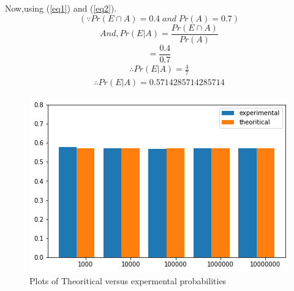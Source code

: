 \documentclass[journal,12pt,twocolumn]{IEEEtran}
\begin{document}
Now,using (\ref{eq1}) and (\ref{eq2}). 
$$(\because Pr(E \cap A)=0.4\; and \; Pr(A)=0.7)$$
$$And, Pr(E|A)=\frac{Pr(E\cap A)}{Pr(A)}$$
$$=\frac{0.4}{0.7}$$
\begin{align}
\therefore Pr(E|A)=\frac{4}{7}    
\end{align}
\begin{align}
\therefore Pr(E|A)=0.5714285714285714    
\end{align}
\begin{figure}
   \caption{Plots of Theoritical versus expermental probabilities}
    \centering
    \includegraphics[width=\columnwidth]
    {Figure.png}
\end{figure}
\end{document}
